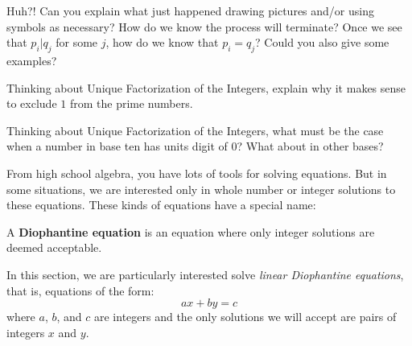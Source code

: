 \begin{question} 
Huh?! Can you explain what just happened drawing pictures and/or using
symbols as necessary? How do we know the process will terminate?  
Once we see that $p_i | q_j$ for some $j$, how do we know that $p_i = q_j$?
Could you also give some examples?
\end{question}
\QM

\begin{question} 
Thinking about Unique Factorization of the Integers, explain why it
makes sense to exclude $1$ from the prime numbers.
\end{question}
\QM


\begin{question} 
Thinking about Unique Factorization of the Integers, what must be the
case when a number in base ten has units digit of $0$?  What about in other bases?  
\end{question}
\QM

From high school algebra, you have lots of tools for solving equations.  
But in some situations, we are interested only in whole number or integer solutions 
to these equations.  These kinds of equations have a special name:  

\begin{definition}
A \textbf{Diophantine equation} is an equation where only integer
solutions are deemed acceptable.
\end{definition}

In this section, we are particularly interested solve \textit{linear Diophantine equations}, that is, equations of the form:
\[
ax + by = c
\]
where $a$, $b$, and $c$ are integers and the only solutions we will
accept are pairs of integers $x$ and $y$.  


\newpage

